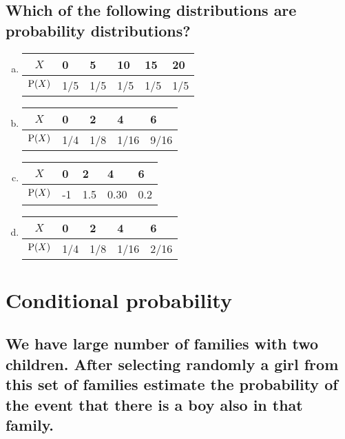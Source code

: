 \subsection{Which of the following distributions are probability distributions?}
\begin{enumerate}[a)]
\item 

	\begin{tabular}{c|C{1cm}|C{1cm}|C{1cm}|C{1cm}|C{1cm}}
	\toprule
	$X$		& 0 & 5 & 10 & 15 & 20\\
	\midrule
	$\P(X)$ &1/5 &1/5&	1/5&	1/5&	1/5\\
	\bottomrule
	\end{tabular}


\item 

	\begin{tabular}{c|C{1cm}|C{1cm}|C{1cm}|C{1cm}}
	\toprule
	$X$		&0 & 2 & 	4 &	6 	\\
	\midrule
	$\P(X)$ &1/4&	1/8&	1/16&	9/16	\\
	\bottomrule
	\end{tabular}

\item 

	\begin{tabular}{c|C{1cm}|C{1cm}|C{1cm}|C{1cm}}
	\toprule
	$X$		&0 & 2 & 	4 &	6
	\\
	\midrule
	$\P(X)$ &-1& 1.5 &	0.30 & 0.2	\\
	\bottomrule
	\end{tabular}

\item	
	\begin{tabular}{c|C{1cm}|C{1cm}|C{1cm}|C{1cm}}
	\toprule
	$X$		&0 & 2 & 	4 &	6 	\\
	\midrule
	$\P(X)$ &1/4&	1/8&	1/16&	2/16	\\
	\bottomrule
	\end{tabular}	
\end{enumerate}


\section{Conditional probability}
\subsection[Conditional probability of having girls and boys]{We have large number of families with two children.  After selecting randomly a girl from this set of families estimate the probability of the event that there is a boy also in that family.}


